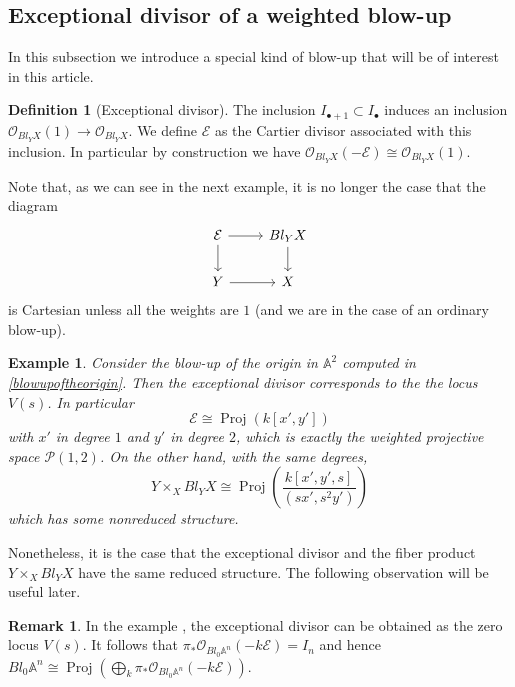 \documentclass{amsart}
\newcommand{\bA}{\mathbb{A}}
\newcommand{\cE}{\mathcal{E}}
\newcommand{\cO}{\mathcal{O}}
\newcommand{\cP}{\mathcal{P}}
\newcommand{\stProj}{\operatorname{Proj}}
\newcommand{\spec}{\operatorname{Spec}}
\newtheorem{example}[theorem]{Example}
\theoremstyle{definition}
\newtheorem{Oss}[theorem]{Remark}
\newtheorem{Def}[theorem]{Definition}
\newcommand{\marg}[1]{\normalsize{{\color{red}\footnote{{\color{blue}#1}}}{\marginpar[{\color{red}\hfill\tiny\thefootnote$\rightarrow$}]{{\color{red}$\leftarrow$\tiny\thefootnote}}}}}
\newcommand{\Gio}[1]{\marg{(Giovanni) #1}}
\begin{document}
\subsection{Exceptional divisor of a weighted blow-up}
In this subsection we introduce a special kind of blow-up that will be of interest in this article.
\begin{Def}[Exceptional divisor]
The inclusion $I_{\bullet + 1}\subset I_{\bullet}$ induces an inclusion $\cO_{Bl_YX}(1) \to \cO_{Bl_Y X}$. We define $\cE$ as the Cartier divisor associated with this inclusion. In particular by construction we have $\cO_{Bl_YX}(-\cE) \cong \cO_{Bl_YX}(1)$.
\end{Def}

Note that, as we can see in the next example, it is no longer the case that the diagram
$$\begin{tikzcd}
\cE \arrow[r] \arrow[d] & Bl_{Y}X \arrow[d] \\
Y \arrow[r] & X
\end{tikzcd}$$
is  Cartesian unless all the weights are $1$ (and we are in the case of an ordinary blow-up). 


\begin{example} Consider the blow-up of the origin in $\bA^2$ computed in \ref{blowupoftheorigin}. Then the exceptional divisor corresponds to the the locus $V(s)$. In particular $$\cE \cong \stProj\left(k[x',y']\right)$$ with $x'$ in degree $1$ and $y'$ in degree $2$, which is exactly the weighted projective space $\cP(1,2)$. 
   On the other hand, with the same degrees, $$Y \times_X Bl_YX \cong \stProj\left(\frac{k[x',y',s]}{(sx', s^2y')}\right)$$ which has some nonreduced structure.
\end{example}

Nonetheless, it is the case that the exceptional divisor and the fiber product $Y \times_X Bl_YX$ have the same reduced structure. 
The following observation will be useful later. 
\begin{Oss}\label{rmk_wblowup_of_0_in_An} In the example ,
 the exceptional divisor can be obtained as the zero locus $V(s)$. It follows that $\pi_*\cO_{Bl_0\bA^n}(-k\cE)=I_n$ and hence
   $Bl_0\bA^n \cong \stProj(\bigoplus_k \pi_*\cO_{Bl_0\bA^n}(-k\cE))$.
\end{Oss}

\end{document}
